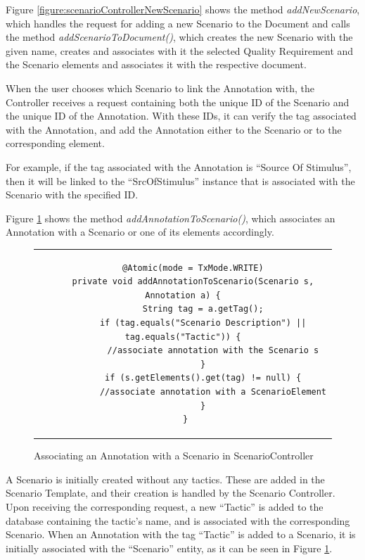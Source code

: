Figure \ref{figure:scenarioControllerNewScenario} shows the method \textit{addNewScenario}, which handles the request for adding a new Scenario to the Document and calls the method \textit{addScenarioToDocument()}, which creates the new Scenario with the given name, creates and associates with it the selected Quality Requirement and the Scenario elements and associates it with the respective document.

When the user chooses which Scenario to link the Annotation with, the Controller receives a request containing both the unique ID of the Scenario and the unique ID of the Annotation. With these IDs, it can verify the tag associated with the Annotation, and add the Annotation either to the Scenario or to the corresponding element. 

For example, if the tag associated with the Annotation is ``Source Of Stimulus'', then it will be linked to the ``SrcOfStimulus'' instance that is associated with the Scenario with the specified ID.

Figure \ref{figure:scenarioControllerLinkAnnotation} shows the method \textit{addAnnotationToScenario()}, which associates an Annotation with a Scenario or one of its elements accordingly.

\begin{figure}[h]
\centering
\lstset{style=customjava}
\begin{tabular}{c}
\begin{lstlisting}
	@Atomic(mode = TxMode.WRITE)
	private void addAnnotationToScenario(Scenario s, Annotation a) {
		String tag = a.getTag();
		if (tag.equals("Scenario Description") || tag.equals("Tactic")) {
			//associate annotation with the Scenario s
		}
		if (s.getElements().get(tag) != null) {
			//associate annotation with a ScenarioElement
		}
	}	
\end{lstlisting}
\end{tabular}
\caption{Associating an Annotation with a Scenario in ScenarioController}
\label{figure:scenarioControllerLinkAnnotation}
\end{figure}

A Scenario is initially created without any tactics. These are added in the Scenario Template, and their creation is handled by the Scenario Controller. Upon receiving the corresponding request, a new ``Tactic'' is added to the database containing the tactic's name, and is associated with the corresponding Scenario. When an Annotation with the tag ``Tactic'' is added to a Scenario, it is initially associated with the ``Scenario'' entity, as it can be seen in Figure \ref{figure:scenarioControllerLinkAnnotation}. 

